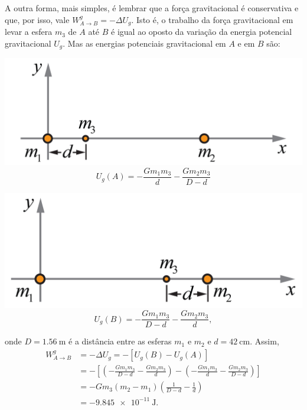 \documentclass[a4paper]{article}
\begin{document}
\begin{resolucoes}
\begin{exercicio}
\begin{enumerate}
  A outra forma, mais simples, é lembrar que a força gravitacional é conservativa e que, por isso, vale $W_{A\to B}^{g} = -\Delta U_g$.
  Isto é, o trabalho da força gravitacional em levar a esfera $m_3$ de $A$ até $B$ é igual ao oposto da variação da energia potencial gravitacional $U_g$.
  Mas as energias potenciais gravitacional em $A$ e em $B$ são:
  
  \begin{minipage}{0.45\textwidth}
  \includegraphics[width=\textwidth]{A}  
  \begin{equation*}
  U_g(A) = -\frac{Gm_1m_3}{d} -\frac{Gm_2m_3}{D-d}
  \end{equation*}
  \end{minipage}\hfill
  \begin{minipage}{0.45\textwidth}
  \includegraphics[width=\textwidth]{B}  
  \begin{equation*}
  U_g(B) = -\frac{Gm_1m_3}{D-d} -\frac{Gm_2m_3}{d},
  \end{equation*}
  \end{minipage} 
  
  \medskip
  
  \noindent
  onde $D = \SI{1.56}{\metre}$ é a distância entre as esferas $m_1$ e $m_2$ e $d = \SI{42}{\centi\metre}$.
  Assim,
  \begin{align*}
  W_{A\to B}^{g} &= -\Delta U_g = -\left[U_g(B) - U_g(A)\right]\\
                 &= -\left[\left(-\frac{Gm_1m_3}{D-d} -\frac{Gm_2m_3}{d}\right) -\left(-\frac{Gm_1m_3}{d} -\frac{Gm_2m_3}{D-d}\right)\right]\\
                 &= -Gm_3(m_2-m_1)\left(\frac{1}{D-d}-\frac{1}{d}\right)\\
                 &= -\SI{9.845e-11}{\joule}.
  \end{align*}


\end{enumerate}
\end{exercicio}
\end{resolucoes}
\end{document}
